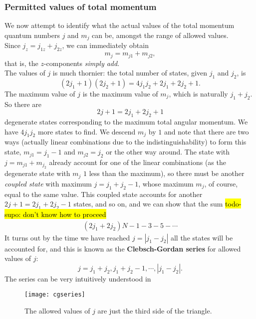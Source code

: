 \subsubsection{Permitted values of total momentum}
\label{perm_totmom}
We now attempt to identify what the actual values of the total momentum quantum 
numbers $j$ and $m_j$ can be, amongst the range of allowed values. \\
Since $j_z=j_{1z}+j_{2z}$, we can immediately obtain
\begin{equation}
\label{add_zmom}
m_j=m_{j1}+m_{j2},
\end{equation}
that is, the $z$-components \textit{simply add}. \\
The values of $j$ is much thornier: the total number of states, given $j_1$ and $j_2$, is 
\begin{equation}
(2j_1+1)(2j_2+1)=4j_1j_2+2j_1+2j_2+1.
\end{equation}
The maximum value of $j$ is the maximum value of $m_j$, which is naturally $j_1+j_2$. So there are 
\begin{equation}
2j+1=2j_1+2j_2+1
\end{equation}
degenerate states corresponding to the maximum total angular momentum. We have 
$4j_1j_2$ more states to find. We descend $m_j$ by $1$ and note that there are two 
ways (actually linear combinations due to the indistinguishability) to form this 
state, $m_{j1}=j_1-1$ and $m_{j2}=j_2$ or the other way around. The state with 
$j=m_{j1}+m_{j_2}$ already account for one of the linear combinations (as the 
degenerate state with $m_j$ $1$ less than the maximum), so there must be another 
\textit{coupled state} with maximum $j=j_1+j_2-1$, whose maximum $m_j$, of course, 
equal to the same value. This coupled state accounts for another 
$2j+1=2j_1+2j_2-1$ states, and so on, and we can show that the sum 
\hl{todo-supo: don't know how to proceed}
\begin{equation}
\begin{aligned}
(2j_1+2j_2)N-1-3-5-\cdots
\end{aligned}
\end{equation}
It turns out by the time we have reached $j=|j_1-j_2|$ all the states will be accounted for, and this is known as the \textbf{Clebsch-Gordan series} for allowed values of $j$:
\begin{equation}
j=j_1+j_2,j_1+j_2-1,\cdots,|j_1-j_2|.
\end{equation}
The series can be very intuitively understood in 
\begin{figure}[H]
	\texttt{[image: cgseries]}
	\centering
	\caption{The allowed values of $j$ are just the third side of the triangle.}
	\label{fig:cgseries}
\end{figure}
